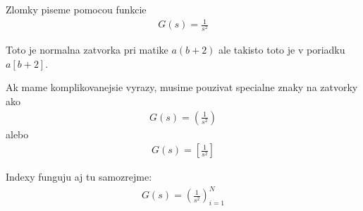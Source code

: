 \documentclass{book}
\begin{document}
Zlomky piseme pomocou funkcie 
\begin{eqnarray}
G(s)=\frac{1}{s^2}
\end{eqnarray}

Toto je normalna zatvorka pri matike $a(b+2)$ ale takisto toto je v poriadku  $a[b+2]$.

Ak mame komplikovanejsie vyrazy, musime pouzivat specialne znaky na zatvorky ako
\begin{eqnarray}
G(s) = \left( \frac{1}{s^2}  \right)
\end{eqnarray}
alebo
\begin{eqnarray}
G(s) = \left[ \frac{1}{s^2}  \right]
\end{eqnarray}

Indexy funguju aj tu samozrejme:
\begin{eqnarray}
G(s) = \left( \frac{1}{s^2}  \right)^N_{i=1}
\end{eqnarray}
\end{document}
